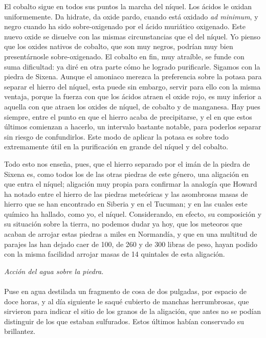 \documentclass[a4paper, 11pt, oneside, polutonikogreek, spanish]{article}
\begin{document}
El cobalto sigue en todos sus puntos la marcha del níquel. Los ácidos le oxidan uniformemente. Da hidrate, da oxide pardo, cuando está oxidado \emph{ad minimum}, y negro cuando ha sido sobre-oxigenado por el ácido muriático oxigenado. Este nuevo oxide se disuelve con las mismas circunstancias que el del níquel. Yo pienso que los oxides nativos de cobalto, que son muy negros, podrían muy bien presentárnosle sobre-oxigenado. El cobalto en fin, muy atraíble, se funde con suma dificultad: ya diré en otra parte cómo he logrado purificarle. Sigamos con la piedra de Sixena. Aunque el amoniaco merezca la preferencia sobre la potasa para separar el hierro del níquel, esta puede sin embargo, servir para ello con la misma ventaja, porque la fuerza con que los ácidos atraen el oxide rojo, es muy inferior a aquella con que atraen los oxides de níquel, de cobalto y de manganesa. Hay pues siempre, entre el punto en que el hierro acaba de precipitarse, y el en que estos últimos comienzan a hacerlo, un intervalo bastante notable, para poderlos separar sin riesgo de confundirlos. Este modo de aplicar la potasa es sobre todo extremamente útil en la purificación en grande del níquel y del cobalto.

Todo esto nos enseña, pues, que el hierro separado por el imán de la piedra de Sixena es, como todos los de las otras piedras de este género, una aligación en que entra el níquel; aligación muy propia para confirmar la analogía que Howard ha notado entre el hierro de las piedras meteóricas y las asombrosas masas de hierro que se han encontrado en Siberia y en el Tucuman; y en las cuales este químico ha hallado, como yo, el níquel. Considerando, en efecto, su composición y su situación sobre la tierra, no podemos dudar ya hoy, que los meteoros que acaban de arrojar estas piedras a miles en Normandía, y que en una multitud de parajes las han dejado caer de 100, de 260 y de 300 libras de peso, hayan podido con la misma facilidad arrojar masas de 14 quintales de esta aligación.
\begin{center}
\emph{Acción del agua sobre la piedra.}
\end{center}
\paragraph{}
Puse en agua destilada un fragmento de cosa de dos pulgadas, por espacio de doce horas, y al día siguiente le saqué cubierto de manchas herrumbrosas, que sirvieron para indicar el sitio de los granos de la aligación, que antes no se podían distinguir de los que estaban sulfurados. Estos últimos habían conservado su brillantez.
\end{document}
